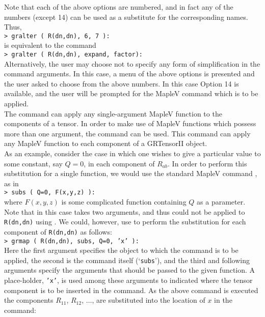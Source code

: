 \documentclass{article}
\begin{document}
{{{Note that each of the above options are numbered, and in fact any of the
numbers (except 14) can be used as a substitute for the corresponding names. 
Thus,\\

\noindent \texttt{> gralter ( R(dn,dn), 6, 7 ):}\\

\noindent is equivalent to the command\\

\noindent \texttt{> gralter ( R(dn,dn), expand, factor):}\\

Alternatively, the user may choose not to specify any form of simplification
in the command arguments. In this case, a menu of the above options is
presented and the user asked to choose from the above numbers. In this
case Option 14 is available, and the user will be prompted for the MapleV
command which is to be applied.\\

The  command can apply any single-argument MapleV function
to the components of a tensor. In order to make use of MapleV
functions which possess more than one argument, the
 command can be used. This command can apply any MapleV
function to each component of a GRTensorII object.\\

As an example, consider the case in which one wishes to give a particular
value to some constant, say $Q = 0$, in each component of $R_{ab}$. 
In order to perform this substitution for a single function, we would 
use the standard MapleV command , as in\\

\noindent\texttt{> subs ( Q=0, F(x,y,z) ):}\\

\noindent where $F(x,y,z)$ is some complicated function containing $Q$
as a parameter. Note that in this case  takes two arguments,
and thus could not be applied to \texttt{R(dn,dn)} using .
We could, however, use  to perform the substitution for each
component of \texttt{R(dn,dn)} as follows:\\

\noindent\texttt{> grmap ( R(dn,dn), subs, Q=0, 'x' ):}\\

Here the first argument specifies the object to which the command is
to be applied, the second is the command itself (`\texttt{subs}'), and
the third and following arguments specify the arguments that should be
passed to the given function. A place-holder, \texttt{'x'}, is used
among these arguments to indicated where the tensor component is to be
inserted in the command. As the above command is executed the
components $R_{11}$, $R_{12}$, $\ldots$, are substituted into the
location of $x$ in the command:\\

}}}
\end{document}
